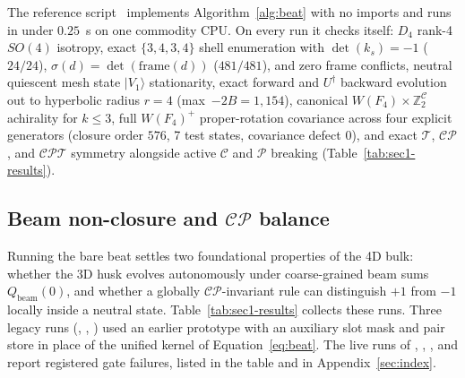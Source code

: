 The reference script \universecode\ implements Algorithm~\ref{alg:beat} with no imports and runs in under $0.25$~s on
one commodity CPU. On every run it checks itself: $D_4$ rank-4 $SO(4)$ isotropy, exact $\{3,4,3,4\}$ shell enumeration
with $\det(k_s) = -1$ ($24/24$), $\sigma(d) = \det(\mathrm{frame}(d))$ ($481/481$), and zero frame conflicts, neutral
quiescent mesh state $|V_1\rangle$ stationarity, exact forward and $U^\dagger$ backward evolution out to hyperbolic
radius $r = 4$ (max~$-2B = 1{,}154$), canonical $W(F_4) \times \mathbb{Z}_2^{\mathcal{C}}$ achirality for $k \le 3$,
full $W(F_4)^+$ proper-rotation covariance across four explicit generators (closure order $576$, 7 test states,
covariance defect $0$), and exact $\mathcal{T}$, $\mathcal{CP}$, and $\mathcal{CPT}$ symmetry alongside active
$\mathcal{C}$ and $\mathcal{P}$ breaking (Table~\ref{tab:sec1-results}).

\subsection{Beam non-closure and \texorpdfstring{$\mathcal{CP}$}{CP} balance}
\label{sec:cp-balance}

Running the bare beat settles two foundational properties of the 4D bulk: whether the 3D husk evolves autonomously under
coarse-grained beam sums $Q_{\mathrm{beam}}(0)$, and whether a globally $\mathcal{CP}$-invariant rule can distinguish
$+1$ from $-1$ locally inside a neutral state. Table~\ref{tab:sec1-results} collects these runs. Three legacy runs
(, , ) used an earlier  prototype with an auxiliary
slot mask and pair store in place of the unified kernel of Equation~\eqref{eq:beat}. The live runs of
, , , and  report registered gate failures, listed in
the table and in Appendix~\ref{sec:index}.

